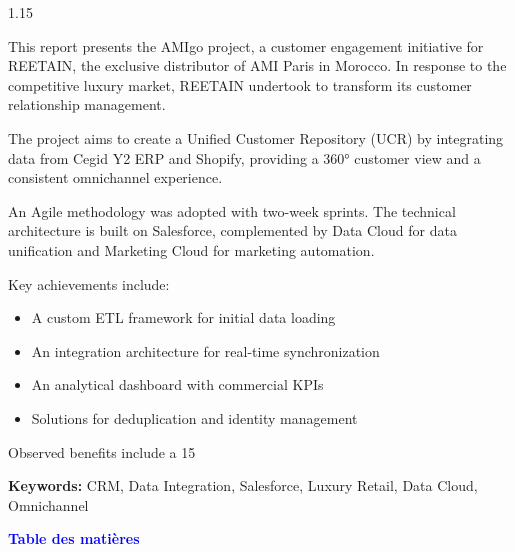 \documentclass[12pt,a4paper,openany,oneside,draft]{report}
\begin{document}
\begin{spacing}{1.15}
\normalsize

This report presents the AMIgo project, a customer engagement initiative for REETAIN, the exclusive distributor of AMI Paris in Morocco. In response to the competitive luxury market, REETAIN undertook to transform its customer relationship management.

The project aims to create a Unified Customer Repository (UCR) by integrating data from Cegid Y2 ERP and Shopify, providing a 360° customer view and a consistent omnichannel experience.

An Agile methodology was adopted with two-week sprints. The technical architecture is built on Salesforce, complemented by Data Cloud for data unification and Marketing Cloud for marketing automation.

Key achievements include:
\begin{itemize}\itemsep0em
  \item A custom ETL framework for initial data loading
  \item An integration architecture for real-time synchronization
  \item An analytical dashboard with commercial KPIs
  \item Solutions for deduplication and identity management
\end{itemize}

Observed benefits include a 15%

\end{spacing}

\vspace{0.5cm}
\noindent\textbf{Keywords:} CRM, Data Integration, Salesforce, Luxury Retail, Data Cloud, Omnichannel

\cleardoublepage
\thispagestyle{plain}
\begin{center}
\Large\bfseries\textcolor{blue}{Table des matières}
\end{center}
\vspace{1cm}
\cleardoublepage

\cleardoublepage

\cleardoublepage

\cleardoublepage
\end{document}
